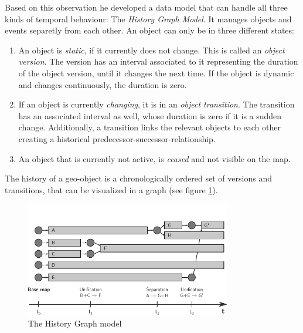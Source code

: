 Based on this observation he developed a data model that can handle all three kinds of temporal behaviour: The \emph{History Graph Model}. It manages objects and events separetly from each other. An object can only be in three different states:
\begin{enumerate}
  \item An object is \emph{static}, if it currently does not change. This is called an \emph{object version}. The version has an interval associated to it representing the duration of the object version, until it changes the next time. If the object is dynamic and changes continuously, the duration is zero.
  \item If an object is currently \emph{changing}, it is in an \emph{object transition}. The transition has an associated interval as well, whose duration is zero if it is a sudden change. Additionally, a transition links the relevant objects to each other creating a historical predecessor-successor-relationship.
  \item An object that is currently not active, is \emph{ceased} and not visible on the map.
\end{enumerate}

The history of a geo-object is a chronologically ordered set of versions and transitions, that can be visualized in a graph (see figure \ref{fig:history_graph_model}).

\begin{figure}[H]
  \centering
  \includegraphics[width=0.8\textwidth]{graphics/basics/stdm/history_graph_model}
  \caption{The History Graph model}
  \label{fig:history_graph_model}
\end{figure}

